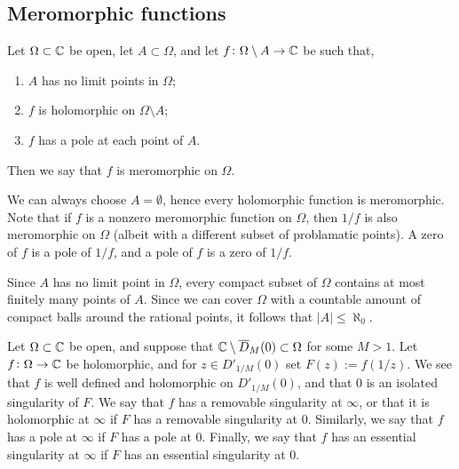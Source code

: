 \documentclass[11pt,a4paper]{article}
\begin{document}
\subsection{Meromorphic functions}
\begin{definition}
  Let $\Omega \subset \mathbb{C}$ be open,
  let $A \subset \Omega$,
  and let $f \colon \Omega \setminus A \to \mathbb{C}$ be such that,
  \begin{enumerate}
    \item[(1)] $A$ has no limit points in $\Omega$;
    \item[(2)] $f$ is holomorphic on $\Omega \setminus A$;
    \item[(3)] $f$ has a pole at each point of $A$.
  \end{enumerate}
  Then we say that $f$ is meromorphic on $\Omega$.
\end{definition}
\begin{remark}
  We can always choose $A = \emptyset$, hence every holomorphic function
  is meromorphic.
  Note that if $f$ is a nonzero meromorphic function on $\Omega$,
  then $1 / f$ is also meromorphic on $\Omega$ (albeit with a different
  subset of problamatic points).
  A zero of $f$ is a pole of $1/f$, and a pole of $f$ is a zero of $1/f$.
\end{remark}
\begin{remark}
  \label{rem:A-is-countable}
  Since $A$ has no limit point in $\Omega$,
  every compact subset of $\Omega$ contains at most finitely many points
  of $A$.
  Since we can cover $\Omega$ with a countable amount of compact balls
  around the rational points, it follows that $|A| \le \aleph_0$.
\end{remark}

\begin{definition}
  Let $\Omega \subset \mathbb{C}$ be open,
  and suppose that $\mathbb{C} \setminus \overline D_{M}(0) \subset \Omega$
  for some $M > 1$.
  Let $f \colon \Omega \to \mathbb{C}$ be holomorphic, and for $z \in D'_{1/M}(0)$
  set $F(z) := f(1/z)$.
  We see that $f$ is well defined and holomorphic on $D'_{1/M}(0)$,
  and that $0$ is an isolated singularity of $F$.
  We say that $f$ has a removable singularity at $\infty$,
  or that it is holomorphic at $\infty$ if $F$ has a removable singularity
  at $0$.
  Similarly, we say that $f$ has a pole at $\infty$ if $F$ has a pole at $0$.
  Finally, we say that $f$ has an essential singularity at $\infty$
  if $F$ has an essential singularity at $0$.
\end{definition}
\end{document}
